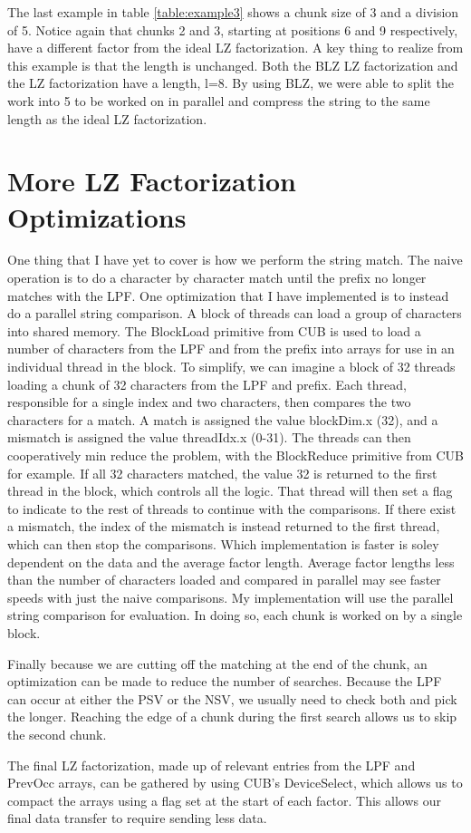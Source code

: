The last example in table \ref{table:example3} shows a chunk size of 3 and a division of 5.
Notice again that chunks 2 and 3, starting at positions 6 and 9 respectively, have a different factor from the ideal LZ factorization.
A key thing to realize from this example is that the length is unchanged.
Both the BLZ LZ factorization and the LZ factorization have a length, l=8.
By using BLZ, we were able to split the work into 5 to be worked on in parallel and compress the string to the same length as the ideal LZ factorization.

\section{More LZ Factorization Optimizations}

One thing that I have yet to cover is how we perform the string match.
The naive operation is to do a character by character match until the prefix no longer matches with the LPF.
One optimization that I have implemented is to instead do a parallel string comparison.
A block of threads can load a group of characters into shared memory.
The BlockLoad primitive from CUB is used to load a number of characters from the LPF and from the prefix into arrays for use in an individual thread in the block.
To simplify, we can imagine a block of 32 threads loading a chunk of 32 characters from the LPF and prefix.
Each thread, responsible for a single index and two characters, then compares the two characters for a match.
A match is assigned the value blockDim.x (32), and a mismatch is assigned the value threadIdx.x (0-31).
The threads can then cooperatively min reduce the problem, with the BlockReduce primitive from CUB for example.
If all 32 characters matched, the value 32 is returned to the first thread in the block, which controls all the logic.
That thread will then set a flag to indicate to the rest of threads to continue with the comparisons.
If there exist a mismatch, the index of the mismatch is instead returned to the first thread, which can then stop the comparisons.
Which implementation is faster is soley dependent on the data and the average factor length.
Average factor lengths less than the number of characters loaded and compared in parallel may see faster speeds with just the naive comparisons.
My implementation will use the parallel string comparison for evaluation.
In doing so, each chunk is worked on by a single block.

Finally because we are cutting off the matching at the end of the chunk, an optimization can be made to reduce the number of searches.
Because the LPF can occur at either the PSV or the NSV, we usually need to check both and pick the longer. 
Reaching the edge of a chunk during the first search allows us to skip the second chunk.

The final LZ factorization, made up of relevant entries from the LPF and PrevOcc arrays, can be gathered by using CUB's DeviceSelect, which allows us to compact the arrays using a flag set at the start of each factor.
This allows our final data transfer to require sending less data.
